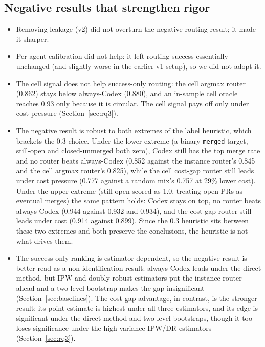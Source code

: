 \documentclass[sigconf,nonacm]{acmart}
\begin{document}
\subsection{Negative results that strengthen rigor}\label{sec:negative}

\begin{itemize}
  \item Removing leakage (v2) did not overturn the negative routing result; it made it sharper.
  \item Per-agent calibration did not help: it left routing success essentially unchanged (and slightly worse in the earlier v1 setup), so we did not adopt it.
  \item The cell signal does not help success-only routing: the cell argmax router (0.862) stays below always-Codex (0.880), and an in-sample cell oracle reaches 0.93 only because it is circular. The cell signal pays off only under cost pressure (Section~\ref{sec:rq3}).
  \item The negative result is robust to both extremes of the label heuristic, which brackets the 0.3 choice. Under the lower extreme (a binary \texttt{merged} target, still-open and closed-unmerged both zero), Codex still has the top merge rate and no router beats always-Codex (0.852 against the instance router's 0.845 and the cell argmax router's 0.825), while the cell cost-gap router still leads under cost pressure (0.777 against a random mix's 0.757 at 29\% lower cost). Under the upper extreme (still-open scored as 1.0, treating open PRs as eventual merges) the same pattern holds: Codex stays on top, no router beats always-Codex (0.944 against 0.932 and 0.934), and the cost-gap router still leads under cost (0.914 against 0.899). Since the 0.3 heuristic sits between these two extremes and both preserve the conclusions, the heuristic is not what drives them.
  \item The success-only ranking is estimator-dependent, so the negative result is better read as a non-identification result: always-Codex leads under the direct method, but IPW and doubly-robust estimators put the instance router ahead and a two-level bootstrap makes the gap insignificant (Section~\ref{sec:baselines}). The cost-gap advantage, in contrast, is the stronger result: its point estimate is highest under all three estimators, and its edge is significant under the direct-method and two-level bootstraps, though it too loses significance under the high-variance IPW/DR estimators (Section~\ref{sec:rq3}).
\end{itemize}
\end{document}
